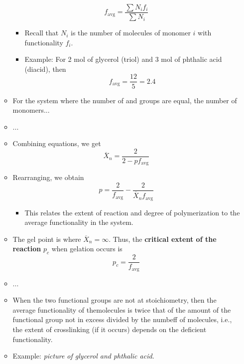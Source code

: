 \documentclass[../notes.tex]{subfiles}
\begin{document}
\begin{itemize}
\begin{itemize}
\begin{equation*}
            f_\text{avg} = \frac{\sum N_if_i}{\sum N_i}
        \end{equation*}
        \begin{itemize}
            \item Recall that $N_i$ is the number of molecules of monomer $i$ with functionality $f_i$.
            \item Example: For 2 mol of glycerol (triol) and 3 mol of phthalic acid (diacid), then
            \begin{equation*}
                f_\text{avg} = \frac{12}{5} = 2.4
            \end{equation*}
        \end{itemize}
        \item For the system where the number of  and  groups are equal, the number of monomers...
        \item ...
        \item Combining equations, we get
        \begin{equation*}
            \overline{X}_n = \frac{2}{2-pf_\text{avg}}
        \end{equation*}
        \item Rearranging, we obtain
        \begin{equation*}
            p = \frac{2}{f_\text{avg}}-\frac{2}{\overline{X}_nf_\text{avg}}
        \end{equation*}
        \begin{itemize}
            \item This relates the extent of reaction and degree of polymerization to the average functionality in the system.
        \end{itemize}
        \item The gel point is where $\overline{X}_n=\infty$. Thus, the \textbf{critical extent of the reaction} $p_c$ when gelation occurs is
        \begin{equation*}
            p_c = \frac{2}{f_\text{avg}}
        \end{equation*}
        \item ...
        \item When the two functional groups are not at stoichiometry, then the average functionality of themolecules is twice that of the amount of the functional group not in excess divided by the numbeff of molecules, i.e., the extent of crosslinking (if it occurs) depends on the deficient functionality.
        \item Example:
        \emph{picture of glycerol and phthalic acid.}

\end{itemize}
\end{itemize}
\end{document}
